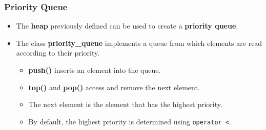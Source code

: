 \documentclass{beamer}
\begin{document}
\begin{frame}%
\frametitle{Priority Queue}


\begin{itemize}
\item The \textbf{heap} previously defined can be used to create a \textbf{priority queue}.\\

\vspace{0.2cm}

\item<2-> The class \textbf{priority\_queue} implements a queue from which elements are read according to their
priority.


\begin{itemize}
\item<2-> \textbf{push()} inserts an element into the queue.

\vspace{0.18cm}

\item<2-> \textbf{top()} and \textbf{pop()} access and remove the next element.

\vspace{0.18cm}

\item<2-> The next element is the element that has the highest priority.

\vspace{0.18cm}

\item<2-> By default, the highest priority is determined using \lstinline{operator <}.







\end{itemize}

\end{itemize}

\end{frame}
\end{document}
